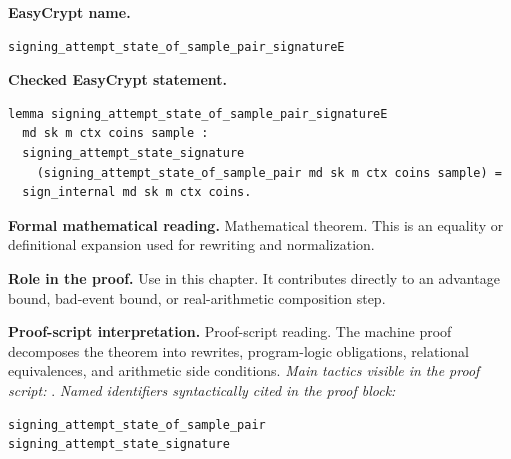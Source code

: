 \begin{formaltheorem}
\noindent\textbf{EasyCrypt name.}
\begin{lstlisting}[language=EasyCrypt,basicstyle=\ttfamily\scriptsize]
signing_attempt_state_of_sample_pair_signatureE
\end{lstlisting}
\noindent\textbf{Checked EasyCrypt statement.}
\begin{lstlisting}[language=EasyCrypt,basicstyle=\ttfamily\scriptsize]
lemma signing_attempt_state_of_sample_pair_signatureE
  md sk m ctx coins sample :
  signing_attempt_state_signature
    (signing_attempt_state_of_sample_pair md sk m ctx coins sample) =
  sign_internal md sk m ctx coins.
\end{lstlisting}
\noindent\textbf{Formal mathematical reading.}
Mathematical theorem. This is an equality or definitional expansion used for rewriting and normalization.

\noindent\textbf{Role in the proof.}
Use in this chapter. It contributes directly to an advantage bound, bad-event bound, or real-arithmetic composition step.

\noindent\textbf{Proof-script interpretation.}
Proof-script reading. The machine proof decomposes the theorem into rewrites, program-logic obligations, relational equivalences, and arithmetic side conditions.
\emph{Main tactics visible in the proof script:} .
\emph{Named identifiers syntactically cited in the proof block:}
\begin{lstlisting}[language=EasyCrypt,basicstyle=\ttfamily\scriptsize]
signing_attempt_state_of_sample_pair
signing_attempt_state_signature
\end{lstlisting}

\end{formaltheorem}

